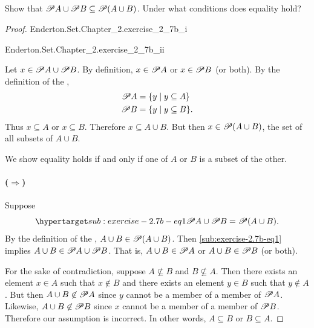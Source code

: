 \documentclass{report}
\begin{document}
\subsection{}%

Show that $\mathscr{P}A \cup \mathscr{P}B \subseteq \mathscr{P}(A \cup B)$.
Under what conditions does equality hold?

\begin{proof}

  \statementpadding

    {Enderton.Set.Chapter\_2.exercise\_2\_7b\_i}

    {Enderton.Set.Chapter\_2.exercise\_2\_7b\_ii}

  Let $x \in \mathscr{P}A \cup \mathscr{P}B$.
  By definition, $x \in \mathscr{P}A$ or $x \in \mathscr{P}B$ (or both).
  By the definition of the ,
    \begin{align*}
      \mathscr{P}A &= \{ y \mid y \subseteq A \} \\
      \mathscr{P}B &= \{ y \mid y \subseteq B \}.
    \end{align*}
  Thus $x \subseteq A$ or $x \subseteq B$.
  Therefore $x \subseteq A \cup B$.
  But then $x \in \mathscr{P}(A \cup B)$, the set of all subsets of $A \cup B$.

  \suitdivider

  We show equality holds if and only if one of $A$ or $B$ is a subset of the
    other.

  \paragraph{($\Rightarrow$)}%

    Suppose
      \begin{equation}
        \hyperlabel{sub:exercise-2.7b-eq1}
        \powerset{A} \cup \powerset{B} = \powerset{(A \cup B)}.
      \end{equation}
    By the definition of the ,
      $A \cup B \in \mathscr{P}(A \cup B)$.
    Then \eqref{sub:exercise-2.7b-eq1} implies
      $A \cup B \in \mathscr{P}A \cup \mathscr{P}B$.
    That is, $A \cup B \in \mathscr{P}A$ or $A \cup B \in \mathscr{P}B$ (or
      both).

    For the sake of contradiction, suppose $A \not\subseteq B$ and
      $B \not\subseteq A$.
    Then there exists an element $x \in A$ such that $x \not\in B$ and there
      exists an element $y \in B$ such that $y \not\in A$.
    But then $A \cup B \not\in \mathscr{P}A$ since $y$ cannot be a member of a
      member of $\mathscr{P}A$.
    Likewise, $A \cup B \not\in \mathscr{P}B$ since $x$ cannot be a member of a
      member of $\mathscr{P}B$.
    Therefore our assumption is incorrect.
    In other words, $A \subseteq B$ or $B \subseteq A$.


\end{proof}
\end{document}
